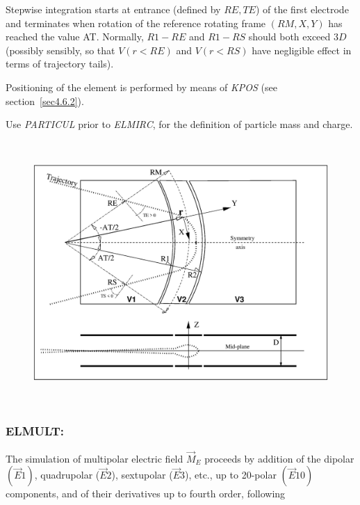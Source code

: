 \noindent Stepwise integration starts at entrance (defined by $R\!E, T\!E$) of the first electrode 
and terminates when rotation of the reference  rotating frame  $(RM,X,Y)$ has reached the value AT. 
Normally, $R1-R\!E$ and $R1-R\!S$ should both  exceed  $3D$ (possibly sensibly, 
so that $V(r<R\!E)$ and $V(r<R\!S)$  have negligible effect in terms of trajectory tails).  

Positioning of the element is performed by means of \textsl{KPOS} (see section~\ref{sec4.6.2}). 

\bigskip

\noindent Use \textsl{PARTICUL} prior to \textsl{ELMIRC}, for the
 definition of particle mass and charge.

\vfill

\begin{figure}[H]
\centerline{\includegraphics[height=10cm]{FigELMIRC.eps}}
\caption{\label{figELMIRC} \CapELMIRC}
\end{figure}

\vfill


\newpage

\subsubsection*{ELMULT: \ELMULTTitl} \label{ELMULT}
\medskip

The simulation of multipolar electric  field $ \vec  M_E $ proceeds by addition of 
the dipolar $ (\vec  E1) $,  quadrupolar ($ \vec  E2 $), sextupolar ($ \vec  E3 $), 
etc.,  up to 20-polar $ (\vec  E10) $ components, and of their derivatives up to fourth 
order, following

